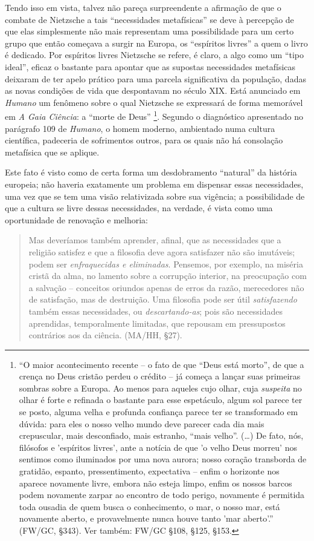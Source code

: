 \documentclass[
	12pt,				%
	openright,			%
	oneside,			%
	a4paper,			%
	english,			%
	french,				%
	spanish,			%
	brazil				%
	]{abntex2}
\begin{document}
Tendo isso em vista, talvez não pareça surpreendente a afirmação de que o combate de Nietzsche a tais “necessidades metafísicas” se deve à percepção de que elas simplesmente não mais representam uma possibilidade para um certo grupo que então começava a surgir na Europa, os “espíritos livres” a quem o livro é dedicado. Por espíritos livres Nietzsche se refere, é claro, a algo como um “tipo ideal”, eficaz o bastante para apontar que as supostas necessidades metafísicas deixaram de ter apelo prático para uma parcela significativa da população, dadas as novas condições de vida que despontavam no século XIX. Está anunciado em \textit{Humano} um fenômeno sobre o qual Nietzsche se expressará de forma memorável em \textit{A Gaia Ciência}: a “morte de Deus”
\footnote{“O maior acontecimento recente – o fato de que “Deus está morto”, de que a crença no Deus cristão perdeu o crédito – já começa a lançar suas primeiras sombras sobre a Europa. Ao menos para aqueles cujo olhar, cuja \textit{suspeita} no olhar é forte e refinada o bastante para esse espetáculo, algum sol parece ter se posto, alguma velha e profunda confiança parece ter se transformado em dúvida: para eles o nosso velho mundo deve parecer cada dia mais crepuscular, mais desconfiado, mais estranho, “mais velho”. (…) De fato, nós, filósofos e 'espíritos livres', ante a notícia de que 'o velho Deus morreu' nos sentimos como iluminados por uma nova aurora; nosso coração transborda de gratidão, espanto, pressentimento, expectativa – enfim o horizonte nos aparece novamente livre, embora não esteja limpo, enfim os nossos barcos podem novamente zarpar ao encontro de todo perigo, novamente é permitida toda ousadia de quem busca o conhecimento, o mar, o nosso mar, está novamente aberto, e provavelmente nunca houve tanto 'mar aberto'.” (FW/GC, §343). Ver também: FW/GC §108, §125, §153.}.
 Segundo o diagnóstico apresentado no parágrafo 109 de \textit{Humano}, o homem moderno, ambientado numa cultura científica, padeceria de sofrimentos outros, para os quais não há consolação metafísica que se aplique.

Este fato é visto como de certa forma um desdobramento “natural” da história europeia; não haveria exatamente um problema em dispensar essas necessidades, uma vez que se tem uma visão relativizada sobre sua vigência; a possibilidade de que a cultura se livre dessas necessidades, na verdade, é vista como uma oportunidade de renovação e melhoria: 

\begin{quotation}
Mas deveríamos também aprender, afinal, que as necessidades que a religião satisfez e que a filosofia deve agora satisfazer não são imutáveis; podem ser \textit{enfraquecidas e eliminadas}. Pensemos, por exemplo, na miséria cristã da alma, no lamento sobre a corrupção interior, na preocupação com a salvação – conceitos oriundos apenas de erros da razão, merecedores não de satisfação, mas de destruição. Uma filosofia pode ser útil \textit{satisfazendo} também essas necessidades, ou \textit{descartando-as}; pois são necessidades aprendidas, temporalmente limitadas, que repousam em pressupostos contrários aos da ciência. (MA/HH, §27).
\end{quotation}
\end{document}
